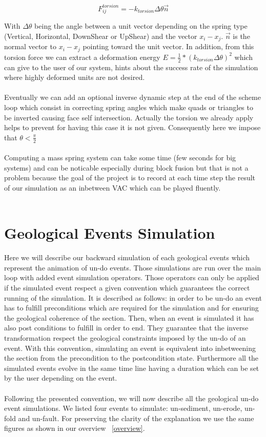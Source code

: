 \documentclass[12pt, a4paper]{report} %
\begin{document}
\begin{equation}
F_{ij}^{torsion} = -k_{torsion}\Delta \theta \vec{n}
\end{equation}

With $\Delta \theta$ being the angle between a unit vector depending on the spring type (Vertical, Horizontal, DownShear or UpShear) and the vector $x_i - x_j$. $\vec{n}$ is the normal vector to $x_i - x_j$ pointing toward the unit vector. In addition, from this torsion force we can extract a deformation energy $ E = \frac{1}{2}*(k_{torsion}\Delta \theta)^2$ which can give to the user of our system, hints about the success rate of the simulation where highly deformed units are not desired.\\\\
Eventually we can add an optional inverse dynamic step at the end of the scheme loop which consist in correcting spring angles which make quads or triangles to be inverted causing face self intersection. Actually the torsion we already apply helps to prevent for having this case it is not given. Consequently here we impose that $\theta < \frac{\pi}{2}$ 
\\\\
Computing a mass spring system can take some time (few seconds for big systems) and can be noticable especially during block fusion but that is not a problem because the goal of the project is to record at each time step the result of our simulation as an inbetween VAC which can be played fluently.\\\\

\section{Geological Events Simulation}
\label{sec:geoevsim}
Here we will describe our backward simulation of each geological events which represent the animation of un-do events. Those simulations are run over the main loop with added event simulation operators. Those operators can only be applied if the simulated event respect a given convention which guarantees the correct running of the simulation. It is described as follows: in order to be un-do an event has to fulfill preconditions which are required for the simulation and for ensuring the geological coherence of the section. Then, when an event is simulated it has also post conditions to fulfill in order to end. They guarantee that the inverse transformation respect the geological constraints imposed by the un-do of an event. With this convention, simulating an event is equivalent into inbetweening the section from the precondition to the postcondition state. Furthermore all the simulated events evolve in the same time line having a duration which can be set by the user depending on the event.\\\\
Following the presented convention, we will now describe all the geological un-do event simulations. We listed four events to simulate: un-sediment, un-erode, un-fold and un-fault. For preserving the clarity of the explanation we use the same figures as shown in our overview ~\ref{overview}.
\end{document}
